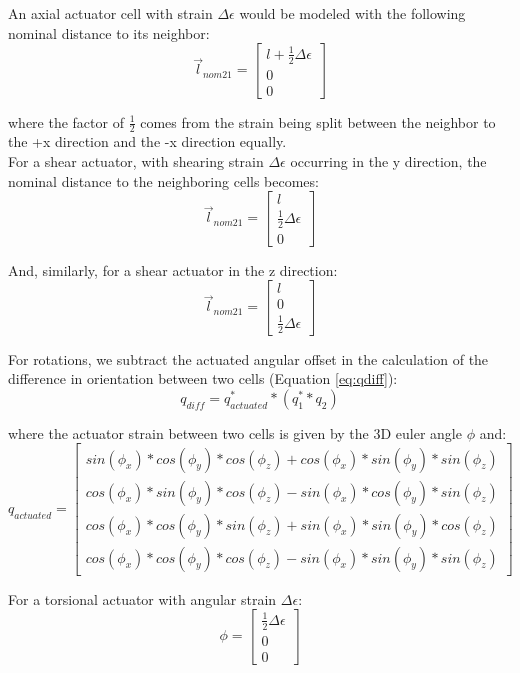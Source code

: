 { An axial actuator cell with strain $\Delta\epsilon$ would be modeled with the following nominal distance to its neighbor:
 \[ \vec{l}_{nom21} =  \left[ \begin{array}{ccc}
l+\tfrac{1}{2}\Delta\epsilon\\
0\\
0
 \end{array} \right] \]
 
 where the factor of $\tfrac{1}{2}$ comes from the strain being split between the neighbor to the +x direction and the -x direction equally.\\
 
 For a shear actuator, with shearing strain $\Delta\epsilon$ occurring in the y direction, the nominal distance to the neighboring cells becomes:
  \[ \vec{l}_{nom21} =  \left[ \begin{array}{ccc}
l\\
\tfrac{1}{2}\Delta\epsilon\\
0
 \end{array} \right] \]
 
 And, similarly, for a shear actuator in the z direction:
   \[ \vec{l}_{nom21} =  \left[ \begin{array}{ccc}
l\\
0\\
\tfrac{1}{2}\Delta\epsilon
 \end{array} \right] \]
 
 For rotations, we subtract the actuated angular offset in the calculation of the difference in orientation between two cells (Equation \ref{eq:qdiff}):
\[ q_{diff} = q_{actuated}^**(q_1^{*}*q_2)\]

where the actuator strain between two cells is given by the 3D euler angle $\phi$ and:
\[ q_{actuated} = \left[ \begin{array}{ccc}
sin(\phi_x) * cos(\phi_y) * cos(\phi_z) + cos(\phi_x) * sin(\phi_y) * sin(\phi_z)\\
cos(\phi_x) * sin(\phi_y) * cos(\phi_z) - sin(\phi_x) * cos(\phi_y) * sin(\phi_z)\\
cos(\phi_x) * cos(\phi_y) * sin(\phi_z) + sin(\phi_x) * sin(\phi_y) * cos(\phi_z)\\
cos(\phi_x) * cos(\phi_y) * cos(\phi_z) - sin(\phi_x) * sin(\phi_y) * sin(\phi_z)
 \end{array} \right]
\]

For a torsional actuator with angular strain $\Delta\epsilon$:
\[ \phi = \left[ \begin{array}{ccc}
\tfrac{1}{2}\Delta\epsilon\\
0\\
0
 \end{array} \right]
\]

}
